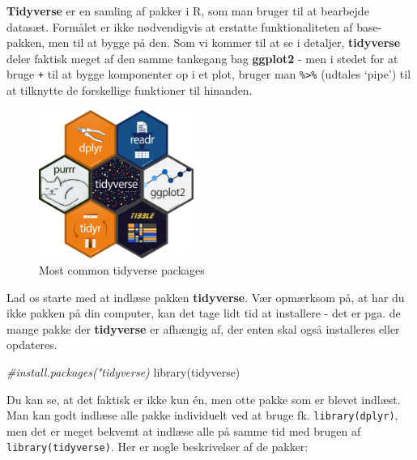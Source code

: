 \documentclass[
]{book}
\newenvironment{Shaded}{\begin{snugshade}}{\end{snugshade}}
\newcommand{\CommentTok}[1]{\textcolor[rgb]{0.56,0.35,0.01}{\textit{#1}}}
\newcommand{\FunctionTok}[1]{\textcolor[rgb]{0.00,0.00,0.00}{#1}}
\newcommand{\NormalTok}[1]{#1}
\begin{document}
\textbf{Tidyverse} er en samling af pakker i R, som man bruger til at bearbejde datasæt. Formålet er ikke nødvendigvis at erstatte funktionaliteten af base-pakken, men til at bygge på den. Som vi kommer til at se i detaljer, \textbf{tidyverse} deler faktisk meget af den samme tankegang bag \textbf{ggplot2} - men i stedet for at bruge \texttt{+} til at bygge komponenter op i et plot, bruger man \texttt{\%\textgreater{}\%} (udtales `pipe') til at tilknytte de forskellige funktioner til hinanden.

\begin{figure}
\centering
\includegraphics[width=0.45\textwidth,height=\textheight]{plots/tidyverse2_packages.png}
\caption{Most common tidyverse packages}
\end{figure}

Lad os starte med at indlæse pakken \textbf{tidyverse}. Vær opmærksom på, at har du ikke pakken på din computer, kan det tage lidt tid at installere - det er pga. de mange pakke der \textbf{tidyverse} er afhængig af, der enten skal også installeres eller opdateres.

\begin{Shaded}
\begin{Highlighting}[]
\CommentTok{\#install.packages("tidyverse)}
\FunctionTok{library}\NormalTok{(tidyverse)}
\end{Highlighting}
\end{Shaded}

Du kan se, at det faktisk er ikke kun én, men otte pakke som er blevet indlæst. Man kan godt indlæse alle pakke individuelt ved at bruge fk. \texttt{library(dplyr)}, men det er meget bekvemt at indlæse alle på samme tid med brugen af \texttt{library(tidyverse)}. Her er nogle beskrivelser af de pakker:
\end{document}
